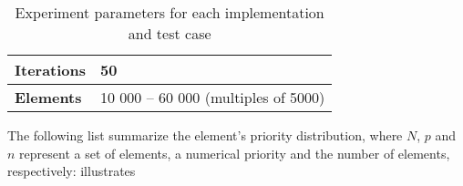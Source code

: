 \documentclass[a4paper,11pt]{kth-mag}
\newcommand*{\skippara}{\par\vspace{\baselineskip} \noindent}
\begin{document}
\begin{table}
    \small
    \caption{Experiment parameters for each implementation and test case}
    \label{tab:param}
    \begin{adjustbox}{center}
        \renewcommand*\arraystretch{1.2}\begin{tabular}{| L{3.5cm} || L{5.5cm} |}
            \hline
            \textbf{Iterations} & 50
            \\ \hline
            \textbf{Elements} & 10 000 -- 60 000 (multiples of 5000)
            \\ \hline
        \end{tabular}
    \end{adjustbox}
\end{table}


\skippara The following list summarize the element's priority distribution, where $N$, $p$ and $n$ represent a set of elements, a numerical priority and the number of elements, respectively:
illustrates
\clearpage
\end{document}

